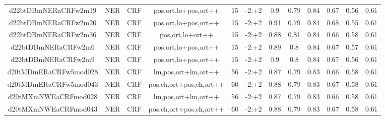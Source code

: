 \documentclass[a4paper]{article}
\begin{document}
\begin{landscape}
\begin{center}
\begin{tabular}{ |c|c|c|c|c|c|c|c|c|c|c|c|}
 	
 
 	
 		
 		\small{ d22btDBmNERaCRFw2m19 } & NER & CRF & pos,ort,lo+pos,ort++  &  15 &  -2:+2  &  0.9 & 0.79 & 0.84  &  0.67 & 0.56 & 0.61 \\
 		

 	
 
 	
 		
 		\small{ d22btDBmNERaCRFw2m20 } & NER & CRF & pos,ort,lo+pos,ort++  &  15 &  -2:+2  &  0.91 & 0.79 & 0.84  &  0.68 & 0.55 & 0.61 \\
 		

 	
 
 	
 		
 		\small{ d22btDBmNERaCRFw2m36 } & NER & CRF & pos,ort,lo+ort++  &  15 &  -2:+2  &  0.88 & 0.81 & 0.84  &  0.66 & 0.58 & 0.61 \\
 		

 	
 
 	
 		
 		\small{ d22btDBmNERaCRFw2m6 } & NER & CRF & pos,ort,lo+pos,ort++  &  15 &  -2:+2  &  0.89 & 0.8 & 0.84  &  0.67 & 0.57 & 0.61 \\
 		

 	
 
 	
 		
 		\small{ d22btDBmNERaCRFw2m9 } & NER & CRF & pos,ort,lo+pos,ort++  &  15 &  -2:+2  &  0.9 & 0.8 & 0.84  &  0.67 & 0.56 & 0.61 \\
 		

 	
 
 	
 		
 		\small{ d20tMDmERaCRFw5mod028 } & NER & CRF & lm,pos,ort+lm,ort++  &  56 &  -2:+2  &  0.87 & 0.79 & 0.83  &  0.66 & 0.58 & 0.61 \\
 		

 	
 
 	
 		
 		\small{ d20tMDmERaCRFw5mod043 } & NER & CRF & pos,ch,ort+pos,ch,ort++  &  60 &  -2:+2  &  0.88 & 0.79 & 0.83  &  0.67 & 0.58 & 0.61 \\
 		

 	
 
 	
 		
 		\small{ d20tMXmNWEaCRFmod028 } & NER & CRF & lm,pos,ort+lm,ort++  &  56 &  -2:+2  &  0.87 & 0.79 & 0.83  &  0.66 & 0.58 & 0.61 \\
 		

 	
 
 	
 		
 		\small{ d20tMXmNWEaCRFmod043 } & NER & CRF & pos,ch,ort+pos,ch,ort++  &  60 &  -2:+2  &  0.88 & 0.79 & 0.83  &  0.67 & 0.58 & 0.61 \\
 		


\end{tabular}
\end{center}
\end{landscape}
\end{document}
